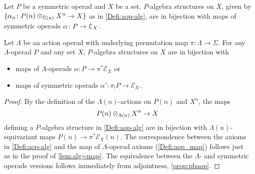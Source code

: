 
\begin{lem}\label{lem:alg=map}
 Let $P$ be a symmetric operad and $X$ be a set. $P$-algebra structures on $X$, given by $\{ \alpha_n \colon  P(n) \otimes_{\Sigma(n)} X^{n} \rightarrow X\}$ as in \cref{Defi:aop-alg}, are in bijection with maps of symmetric operads $\alpha \colon P \to \mathcal{E}_X$.
\end{lem}

\begin{cor}\label{cor:pi-star}
Let $\Lambda$ be an action operad with underlying permutation map $\pi \colon \Lambda \to \Sigma$. 
 For any $\Lambda$-operad $P$ and any set $X$, $P$-algebra structures on $X$ are in bijection with 
\begin{itemize}
\item maps of $\Lambda$-operads $\alpha \colon P \to \pi^* \mathcal{E}_X$ or
\item maps of symmetric operads $\alpha' \colon \pi_{!}P \to  \mathcal{E}_X$.
\end{itemize}
\end{cor}
\begin{proof}
By the definition of the $\Lambda(n)$-actions on $P(n)$ and $X^n$, the maps \[P(n) \otimes_{\Lambda(n)} X^{n} \rightarrow X\] defining a $P$-algebra structure in \cref{Defi:aop-alg} are in bijection with 
$\Lambda(n)$-equivariant maps $P(n) \to \pi^*\mathcal{E}_X(n)$. The correspondence between the axioms in \cref{Defi:aop-alg} and the map of $\Lambda$-operad axioms (\cref{Defi:aop_map}) follows just as in the proof of \cref{lem:alg=map}. The equivalence between the $\Lambda$- and symmetric operads versions follows immediately from adjointness, \cref{prop:pbaop}.
\end{proof}

